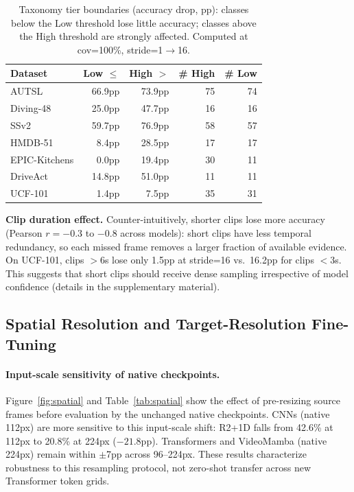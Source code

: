 \documentclass[runningheads]{llncs}
\newcommand{\tabtight}{\setlength{\tabcolsep}{3.5pt}\renewcommand{\arraystretch}{1.10}}
\newcommand{\rev}[1]{\textcolor{revblue}{#1}}
\newcommand{\revdel}[1]{}
\begin{document}
\begin{table}[t]
\centering
\caption{\rev{Taxonomy tier boundaries (accuracy drop, pp): classes below the Low threshold lose little accuracy; classes above the High threshold are strongly affected. Computed at cov=100\%, stride=1$\to$16.}}
\label{tab:taxonomy_thresholds}
\scriptsize\tabtight
\begin{tabular}{l r r r r}
\toprule
Dataset & Low $\leq$ & High $>$ & \# High & \# Low \\
\midrule
AUTSL         & 66.9pp & 73.9pp & 75 & 74 \\
Diving-48     & 25.0pp & 47.7pp & 16 & 16 \\
SSv2          & 59.7pp & 76.9pp & 58 & 57 \\
HMDB-51       &  8.4pp & 28.5pp & 17 & 17 \\
EPIC-Kitchens &  0.0pp & 19.4pp & 30 & 11 \\
DriveAct      & 14.8pp & 51.0pp & 11 & 11 \\
UCF-101       &  1.4pp &  7.5pp & 35 & 31 \\
\bottomrule
\end{tabular}
\end{table}

\textbf{Clip duration effect.} Counter-intuitively, shorter clips \rev{lose more accuracy} (Pearson $r=-0.3$ to $-0.8$ across models): short clips have less temporal redundancy, so each missed frame removes a larger fraction of available evidence. On UCF-101, clips $>$6s lose only 1.5pp at stride=16 vs.\ 16.2pp for clips $<$3s. This suggests that short clips should receive dense sampling irrespective of model confidence (details in the supplementary material).

\subsection{Spatial Resolution and Target-Resolution Fine-Tuning}
\label{sec:results_spatial}

\paragraph{\rev{Input-scale sensitivity of native checkpoints.}}
\revdel{Figure~\ref{fig:spatial} and Table~\ref{tab:spatial} show accuracy vs.\ input resolution for all 8 models on SSv2, evaluated \emph{without retraining}. A related empirical split appears in the spatial domain. CNNs (native 112px) degrade sharply at higher resolutions: R2+1D drops from 42.6\% at 112px to 20.8\% at 224px ($-21.8$pp). Transformers and VideoMamba (native 224px) stay within $\pm$7pp across 96--224px.}\rev{Figure~\ref{fig:spatial} and Table~\ref{tab:spatial} show the effect of pre-resizing source frames before evaluation by the unchanged native checkpoints. CNNs (native 112px) are more sensitive to this input-scale shift: R2+1D falls from 42.6\% at 112px to 20.8\% at 224px ($-21.8$pp). Transformers and VideoMamba (native 224px) remain within $\pm$7pp across 96--224px. These results characterize robustness to this resampling protocol, not zero-shot transfer across new Transformer token grids.}
\end{document}
